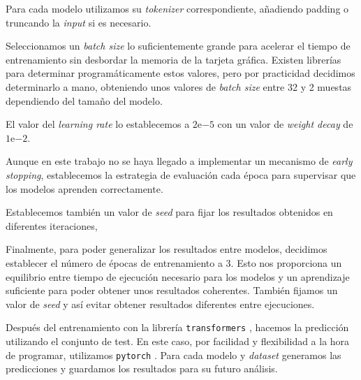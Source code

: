 Para cada modelo utilizamos su \textit{tokenizer} correspondiente, añadiendo padding o truncando la \textit{input} si es necesario.

Seleccionamos un \textit{batch size} lo suficientemente grande para acelerar el tiempo de entrenamiento sin desbordar la memoria de la tarjeta gráfica. Existen librerías para determinar programáticamente estos valores, pero por practicidad decidimos determinarlo a mano, obteniendo unos valores de \textit{batch size} entre 32 y 2 muestas dependiendo del tamaño del modelo.

El valor del \textit{learning rate} lo establecemos a $2\mathrm{e}{-5}$ con un valor de \textit{weight decay} de $1\mathrm{e}{-2}$.

Aunque en este trabajo no se haya llegado a implementar un mecanismo de \textit{early stopping}, establecemos la estrategia de evaluación cada época para supervisar que los modelos aprenden correctamente.

Establecemos también un valor de \textit{seed} para fijar los resultados obtenidos en diferentes iteraciones, 

Finalmente, para poder generalizar los resultados entre modelos, decidimos establecer el número de épocas de entrenamiento a 3. Esto nos proporciona un equilibrio entre tiempo de ejecución necesario para los modelos y un aprendizaje suficiente para poder obtener unos resultados coherentes. También fijamos un valor de \textit{seed} y así evitar obtener resultados diferentes entre ejecuciones.

Después del entrenamiento con la librería \texttt{transformers} \citep{transformers}, hacemos la predicción utilizando el conjunto de test. En este caso, por facilidad y flexibilidad a la hora de programar, utilizamos \texttt{pytorch} \citep{pytorch}. Para cada modelo y \textit{dataset} generamos las predicciones y guardamos los resultados para su futuro análisis.
